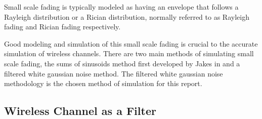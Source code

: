 
Small scale fading is typically modeled as having an %
envelope that follows a Rayleigh distribution or a %
Rician distribution, normally referred to as Rayleigh %
fading and Rician fading respectively. %


Good modeling and simulation of this small scale fading %
is crucial to the accurate simulation of wireless channels. %
There are two main methods of simulating small scale fading, %
the sums of sinusoids method first developed by Jakes in %
\cite{Jakes74} and a filtered white gaussian noise method. %
The filtered white gaussian noise methodology is the chosen %
method of simulation for this report.

\subsection{Wireless Channel as a Filter}





